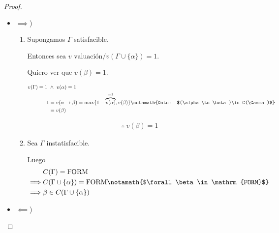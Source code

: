 \begin{proof} \phantom{.}

    \begin{itemize}
        \item $\implies$) 
            \begin{enumerate}[%
                            labelindent=*,
                            style=multiline,
                            leftmargin=*,
                            align=left,
                            leftmargin=2\parindent,
                            label=Caso \arabic*)]
            \item Supongamos $\Gamma$ satisfacible. 
                
                Entonces sea $v \text{ valuación}/ 
                v(\Gamma \cup \{ \alpha \}) = 1$.

                Quiero ver que $v(\beta)=1$.

                \medskip
                \begin{align*}
                    v(\Gamma) = 1 ~ &\wedge ~ v(\alpha) = 1 \\
                    1 &= v(\alpha\to\beta) = \max \{ 1 - 
                        \overbrace{v(\alpha)}^{=1}, v(\beta) \} 
                    \notamath{Dato: $(\alpha\to\beta)\in C(\Gamma)$} \\
                      &= v(\beta)
                \end{align*}

                \begin{gather*}
                    \therefore ~ v(\beta) = 1
                \end{gather*}
            
            \item Sea $\Gamma$ instatisfacible.

                Luego
                \begin{align*}
                    \phantom{\implies}& C(\Gamma) = \mathrm{FORM} \\
                    \implies& C(\Gamma \cup \{ \alpha \}) = \mathrm{FORM} 
                    \notamath{$\forall \beta \in \mathrm{FORM}$} \\
                    \implies& \beta \in C(\Gamma \cup \{ \alpha \})
                \end{align*}
        
        \end{enumerate}

        \item $\impliedby$) 


\end{itemize}
\end{proof}
